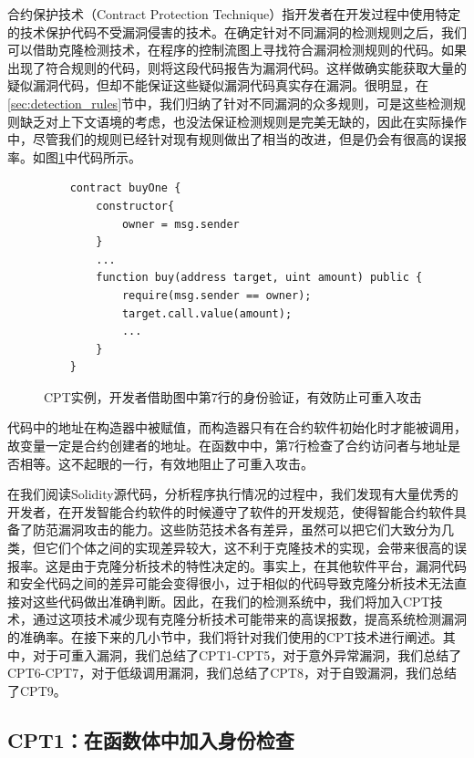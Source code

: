 合约保护技术（Contract Protection Technique）指开发者在开发过程中使用特定的技术保护代码不受漏洞侵害的技术。在确定针对不同漏洞的检测规则之后，我们可以借助克隆检测技术，在程序的控制流图上寻找符合漏洞检测规则的代码。如果出现了符合规则的代码，则将这段代码报告为漏洞代码。这样做确实能获取大量的疑似漏洞代码，但却不能保证这些疑似漏洞代码真实存在漏洞。很明显，在\ref{sec:detection_rules}节中，我们归纳了针对不同漏洞的众多规则，可是这些检测规则缺乏对上下文语境的考虑，也没法保证检测规则是完美无缺的，因此在实际操作中，尽管我们的规则已经针对现有规则做出了相当的改进，但是仍会有很高的误报率。如图\ref{fig:ss_example}中代码所示。
\begin{figure}
\begin{minipage}[htb]{1.0\linewidth}
    \begin{lstlisting}
    contract buyOne {
        constructor{
            owner = msg.sender
        }
        ...
        function buy(address target, uint amount) public {
            require(msg.sender == owner);
            target.call.value(amount);
            ...
        }
    }
    \end{lstlisting}
\end{minipage}
\vspace{-5mm}
\caption{CPT实例，开发者借助图中第7行的身份验证，有效防止可重入攻击}
\label{fig:ss_example}
\end{figure}
代码中的地址在构造器中被赋值，而构造器只有在合约软件初始化时才能被调用，故变量一定是合约创建者的地址。在函数中中，第7行检查了合约访问者与地址是否相等。这不起眼的一行，有效地阻止了可重入攻击。

在我们阅读Solidity源代码，分析程序执行情况的过程中，我们发现有大量优秀的开发者，在开发智能合约软件的时候遵守了软件的开发规范，使得智能合约软件具备了防范漏洞攻击的能力。这些防范技术各有差异，虽然可以把它们大致分为几类，但它们个体之间的实现差异较大，这不利于克隆技术的实现，会带来很高的误报率。这是由于克隆分析技术的特性决定的。事实上，在其他软件平台，漏洞代码和安全代码之间的差异可能会变得很小，过于相似的代码导致克隆分析技术无法直接对这些代码做出准确判断。因此，在我们的检测系统中，我们将加入CPT技术，通过这项技术减少现有克隆分析技术可能带来的高误报数，提高系统检测漏洞的准确率。在接下来的几小节中，我们将针对我们使用的CPT技术进行阐述。其中，对于可重入漏洞，我们总结了CPT1-CPT5，对于意外异常漏洞，我们总结了CPT6-CPT7，对于低级调用漏洞，我们总结了CPT8，对于自毁漏洞，我们总结了CPT9。

\subsection{CPT1：在函数体中加入身份检查}

